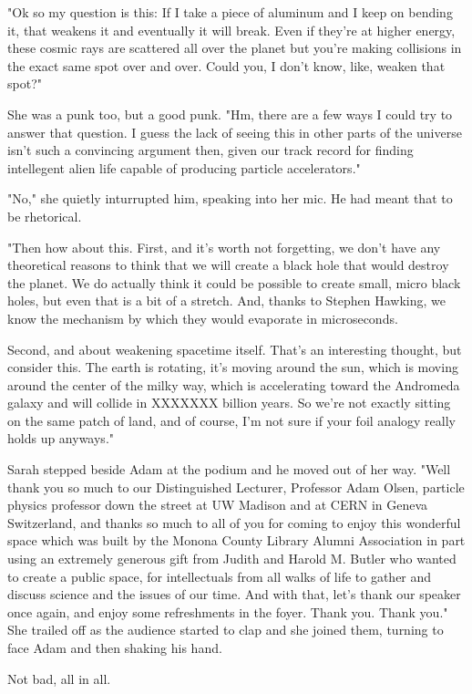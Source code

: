 "Ok so my question is this: If I take a piece of aluminum and I keep on bending it, that weakens it and eventually it will break. Even if they're at higher energy, these cosmic rays are scattered all over the planet but you're making collisions in the exact same spot over and over. Could you, I don't know, like, weaken that spot?"

She was a punk too, but a good punk. "Hm, there are a few ways I could try to answer that question. I guess the lack of seeing this in other parts of the universe isn't such a convincing argument then, given our track record for finding intellegent alien life capable of producing particle accelerators."

"No," she quietly inturrupted him, speaking into her mic. He had meant that to be rhetorical.

"Then how about this. First, and it's worth not forgetting, we don't have any theoretical reasons to think that we will create a black hole that would destroy the planet. We do actually think it could be possible to create small, micro black holes, but even that is a bit of a stretch. And, thanks to Stephen Hawking, we know the mechanism by which they would evaporate in microseconds.

Second, and about weakening spacetime itself. That's an interesting thought, but consider this. The earth is rotating, it's moving around the sun, which is moving around the center of the milky way, which is accelerating toward the Andromeda galaxy and will collide in XXXXXXX billion years. So we're not exactly sitting on the same patch of land, and of course, I'm not sure if your foil analogy really holds up anyways."

\mypause

Sarah stepped beside Adam at the podium and he moved out of her way. "Well thank you so much to our Distinguished Lecturer, Professor Adam Olsen, particle physics professor down the street at UW Madison and at CERN in Geneva Switzerland, and thanks so much to all of you for coming to enjoy this wonderful space which was built by the Monona County Library Alumni Association in part using an extremely generous gift from Judith and Harold M. Butler who wanted to create a public space, for intellectuals from all walks of life to gather and discuss science and the issues of our time. And with that, let's thank our speaker once again, and enjoy some refreshments in the foyer. Thank you. Thank you." She trailed off as the audience started to clap and she joined them, turning to face Adam and then shaking his hand. 

\mymark

Not bad, all in all. 


